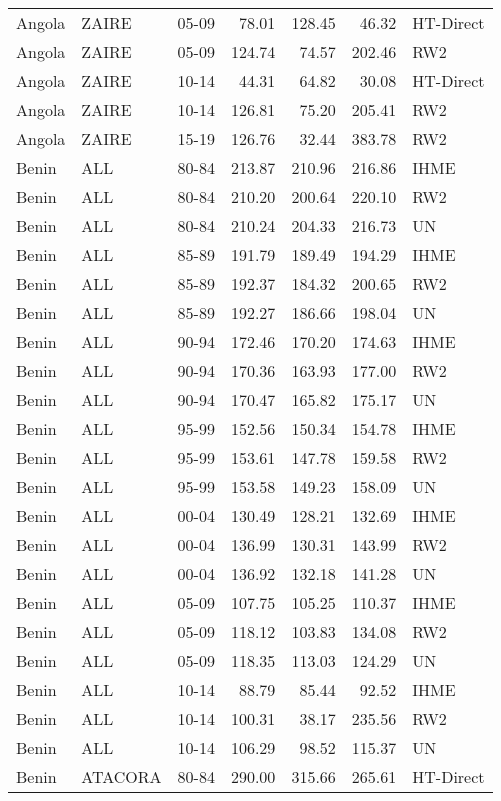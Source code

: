 \begin{longtable}{lllrrrl}
  Angola & ZAIRE & 05-09 & 78.01 & 128.45 & 46.32 & HT-Direct \\ 
  Angola & ZAIRE & 05-09 & 124.74 & 74.57 & 202.46 & RW2 \\ 
  Angola & ZAIRE & 10-14 & 44.31 & 64.82 & 30.08 & HT-Direct \\ 
  Angola & ZAIRE & 10-14 & 126.81 & 75.20 & 205.41 & RW2 \\ 
  Angola & ZAIRE & 15-19 & 126.76 & 32.44 & 383.78 & RW2 \\ 
  Benin & ALL & 80-84 & 213.87 & 210.96 & 216.86 & IHME \\ 
  Benin & ALL & 80-84 & 210.20 & 200.64 & 220.10 & RW2 \\ 
  Benin & ALL & 80-84 & 210.24 & 204.33 & 216.73 & UN \\ 
  Benin & ALL & 85-89 & 191.79 & 189.49 & 194.29 & IHME \\ 
  Benin & ALL & 85-89 & 192.37 & 184.32 & 200.65 & RW2 \\ 
  Benin & ALL & 85-89 & 192.27 & 186.66 & 198.04 & UN \\ 
  Benin & ALL & 90-94 & 172.46 & 170.20 & 174.63 & IHME \\ 
  Benin & ALL & 90-94 & 170.36 & 163.93 & 177.00 & RW2 \\ 
  Benin & ALL & 90-94 & 170.47 & 165.82 & 175.17 & UN \\ 
  Benin & ALL & 95-99 & 152.56 & 150.34 & 154.78 & IHME \\ 
  Benin & ALL & 95-99 & 153.61 & 147.78 & 159.58 & RW2 \\ 
  Benin & ALL & 95-99 & 153.58 & 149.23 & 158.09 & UN \\ 
  Benin & ALL & 00-04 & 130.49 & 128.21 & 132.69 & IHME \\ 
  Benin & ALL & 00-04 & 136.99 & 130.31 & 143.99 & RW2 \\ 
  Benin & ALL & 00-04 & 136.92 & 132.18 & 141.28 & UN \\ 
  Benin & ALL & 05-09 & 107.75 & 105.25 & 110.37 & IHME \\ 
  Benin & ALL & 05-09 & 118.12 & 103.83 & 134.08 & RW2 \\ 
  Benin & ALL & 05-09 & 118.35 & 113.03 & 124.29 & UN \\ 
  Benin & ALL & 10-14 & 88.79 & 85.44 & 92.52 & IHME \\ 
  Benin & ALL & 10-14 & 100.31 & 38.17 & 235.56 & RW2 \\ 
  Benin & ALL & 10-14 & 106.29 & 98.52 & 115.37 & UN \\ 
  Benin & ATACORA & 80-84 & 290.00 & 315.66 & 265.61 & HT-Direct \\ 

\end{longtable}
